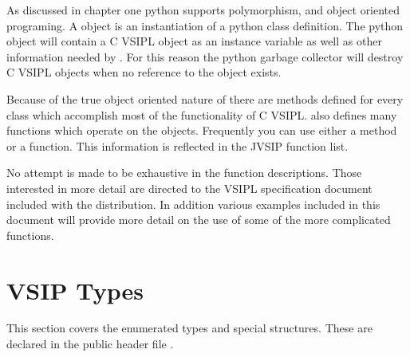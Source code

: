 As discussed in chapter one python supports polymorphism, and object oriented programing. A \pyjv object is an instantiation of a python class definition. The python object will contain a C VSIPL object as an instance variable as well as other information needed by \pyjv. For this reason the python garbage collector will destroy C VSIPL objects when no reference to the \pyjv object exists.

Because of the true object oriented nature of \pyjv there are methods defined for every class which accomplish most of the functionality of C VSIPL.  also defines many functions which operate on the \pyjv objects. Frequently you can use either a method or a function. This information is reflected in the JVSIP function list.

No attempt is made to be exhaustive in the function descriptions. Those interested in more detail are directed to the VSIPL specification document included with the \jv distribution. In addition various examples included in this document will provide more detail on the use of some of the more complicated functions.
%
   
   
     
   
   
   
      
      
      
      
      
      
      
      
      
   
      
      
      
      
      
   
      
      
    
%
\section*{VSIP Types}
This section covers the enumerated types and special structures. These are declared in the public header file .
%
